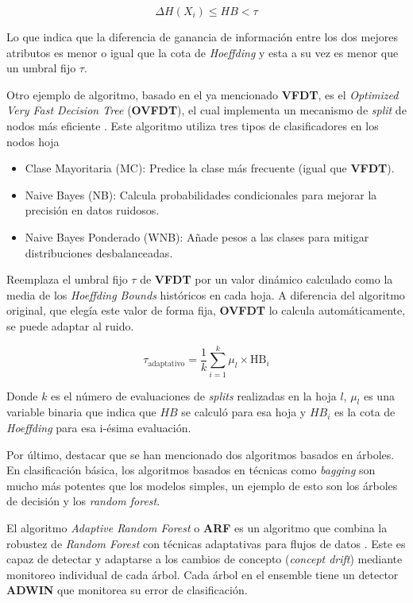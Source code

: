 \documentclass[12pt,letterpaper]{article}
\begin{document}
$$\Delta H(X_i)\le HB< \tau$$

Lo que indica que la diferencia de ganancia de información entre los dos mejores atributos es menor o igual que la cota de \textit{Hoeffding} y esta a su vez es menor que un umbral fijo $\tau$.

Otro ejemplo de algoritmo, basado en el ya mencionado \textbf{VFDT}, es el \textit{Optimized Very Fast Decision Tree} (\textbf{OVFDT}), el cual implementa un mecanismo de \textit{split} de nodos más eficiente \cite{Yang2013}.
Este algoritmo utiliza tres tipos de clasificadores en los nodos hoja
\begin{itemize}
    \item Clase Mayoritaria (MC): Predice la clase más frecuente (igual que \textbf{VFDT}).
    \item Naive Bayes (NB): Calcula probabilidades condicionales para mejorar la precisión en datos ruidosos.
    \item Naive Bayes Ponderado (WNB): Añade pesos a las clases para mitigar distribuciones desbalanceadas.
\end{itemize}

Reemplaza el umbral fijo $\tau$ de \textbf{VFDT} por un valor dinámico calculado como la media de los \textit{Hoeffding Bounds} históricos en cada hoja. A diferencia del algoritmo original, que elegía este valor de forma fija, \textbf{OVFDT} lo calcula automáticamente, se puede adaptar al ruido.

$$
    \tau_{\text{adaptativo}} = \frac{1}{k} \sum_{i=1}^k \mu_l \times \text{HB}_i
$$

Donde $k$ es el número de evaluaciones de \textit{splits} realizadas en la hoja $l$, $\mu_l$ es una variable binaria que indica que $HB$ se calculó para esa hoja y $HB_i$ es la cota de \textit{Hoeffding} para esa i-ésima evaluación.

Por último, destacar que se han mencionado dos algoritmos basados en árboles. En clasificación básica, los algoritmos basados en técnicas como \textit{bagging} son mucho más potentes que los modelos simples, un ejemplo de esto son los árboles de decisión y los \textit{random forest}.

El algoritmo \textit{Adaptive Random Forest} o \textbf{ARF} es un algoritmo que combina la robustez de \textit{Random Forest} con técnicas adaptativas para flujos de datos \cite{gomes2017adaptive}. Este es capaz de detectar y adaptarse a los cambios de concepto (\textit{concept drift}) mediante monitoreo individual de cada árbol. Cada árbol en el ensemble tiene un detector \textbf{ADWIN} que monitorea su error de clasificación.
\end{document}
